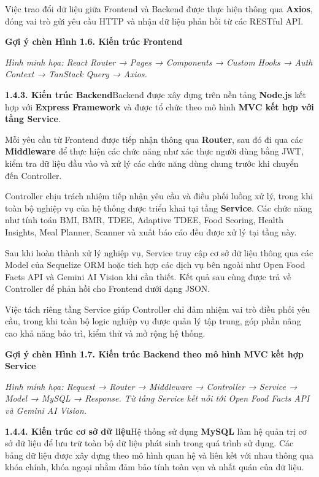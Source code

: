 Việc trao đổi dữ liệu giữa Frontend và Backend được thực hiện thông qua \textbf{Axios}, đóng vai trò gửi yêu cầu HTTP và nhận dữ liệu phản hồi từ các RESTful API.

\textbf{Gợi ý chèn Hình 1.6. Kiến trúc Frontend}

\textit{Hình minh họa: React Router → Pages → Components → Custom Hooks → Auth Context → TanStack Query → Axios.}

\textbf{1.4.3. Kiến trúc Backend}Backend được xây dựng trên nền tảng \textbf{Node.js} kết hợp với \textbf{Express Framework} và được tổ chức theo mô hình \textbf{MVC kết hợp với tầng Service}.

Mỗi yêu cầu từ Frontend được tiếp nhận thông qua \textbf{Router}, sau đó đi qua các \textbf{Middleware} để thực hiện các chức năng như xác thực người dùng bằng JWT, kiểm tra dữ liệu đầu vào và xử lý các chức năng dùng chung trước khi chuyển đến Controller.

Controller chịu trách nhiệm tiếp nhận yêu cầu và điều phối luồng xử lý, trong khi toàn bộ nghiệp vụ của hệ thống được triển khai tại tầng \textbf{Service}. Các chức năng như tính toán BMI, BMR, TDEE, Adaptive TDEE, Food Scoring, Health Insights, Meal Planner, Scanner và xuất báo cáo đều được xử lý tại tầng này.

Sau khi hoàn thành xử lý nghiệp vụ, Service truy cập cơ sở dữ liệu thông qua các Model của Sequelize ORM hoặc tích hợp các dịch vụ bên ngoài như Open Food Facts API và Gemini AI Vision khi cần thiết. Kết quả sau cùng được trả về Controller để phản hồi cho Frontend dưới dạng JSON.

Việc tách riêng tầng Service giúp Controller chỉ đảm nhiệm vai trò điều phối yêu cầu, trong khi toàn bộ logic nghiệp vụ được quản lý tập trung, góp phần nâng cao khả năng bảo trì, kiểm thử và mở rộng hệ thống.

\textbf{Gợi ý chèn Hình 1.7. Kiến trúc Backend theo mô hình MVC kết hợp Service}

\textit{Hình minh họa: Request → Router → Middleware → Controller → Service → Model → MySQL → Response. Từ tầng Service kết nối tới Open Food Facts API và Gemini AI Vision.}

\textbf{1.4.4. Kiến trúc cơ sở dữ liệu}Hệ thống sử dụng \textbf{MySQL} làm hệ quản trị cơ sở dữ liệu để lưu trữ toàn bộ dữ liệu phát sinh trong quá trình sử dụng. Các bảng dữ liệu được xây dựng theo mô hình quan hệ và liên kết với nhau thông qua khóa chính, khóa ngoại nhằm đảm bảo tính toàn vẹn và nhất quán của dữ liệu.

